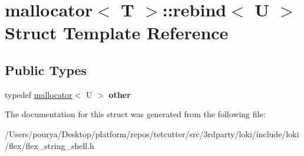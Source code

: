 \hypertarget{structmallocator_1_1rebind}{}\section{mallocator$<$ T $>$\+:\+:rebind$<$ U $>$ Struct Template Reference}
\label{structmallocator_1_1rebind}
\subsection*{Public Types}
\begin{DoxyCompactItemize}
\item 
\hypertarget{structmallocator_1_1rebind_a60d9bdce64bae53f23dfd691625e01d3}{}typedef \hyperlink{classmallocator}{mallocator}$<$ U $>$ {\bfseries other}\label{structmallocator_1_1rebind_a60d9bdce64bae53f23dfd691625e01d3}

\end{DoxyCompactItemize}


The documentation for this struct was generated from the following file\+:\begin{DoxyCompactItemize}
\item 
/\+Users/pourya/\+Desktop/platform/repos/tetcutter/src/3rdparty/loki/include/loki/flex/flex\+\_\+string\+\_\+shell.\+h\end{DoxyCompactItemize}
